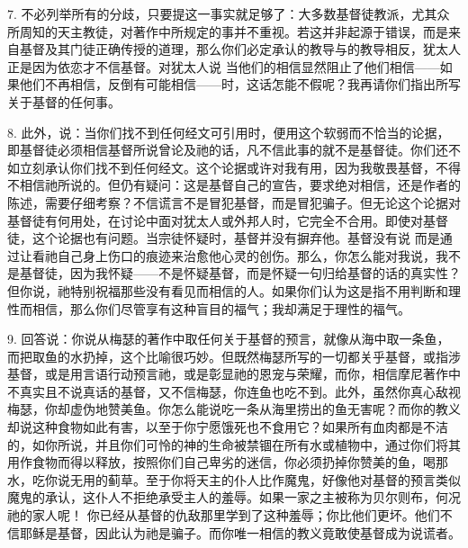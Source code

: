 7. 不必列举所有的分歧，只要提这一事实就足够了：大多数基督徒教派，尤其众所周知的天主教徒，对著作中所规定的事并不重视。若这并非起源于错误，而是来自基督及其门徒正确传授的道理，那么你们必定承认的教导与的教导相反，犹太人正是因为依恋才不信基督。对犹太人说 当他们的相信显然阻止了他们相信——如果他们不再相信，反倒有可能相信——时，这话怎能不假呢？我再请你们指出所写关于基督的任何事。\par

8. 此外，说：当你们找不到任何经文可引用时，便用这个软弱而不恰当的论据，即基督徒必须相信基督所说曾论及祂的话，凡不信此事的就不是基督徒。你们还不如立刻承认你们找不到任何经文。这个论据或许对我有用，因为我敬畏基督，不得不相信祂所说的。但仍有疑问：这是基督自己的宣告，要求绝对相信，还是作者的陈述，需要仔细考察？不信谎言不是冒犯基督，而是冒犯骗子。但无论这个论据对基督徒有何用处，在讨论中面对犹太人或外邦人时，它完全不合用。即使对基督徒，这个论据也有问题。当宗徒怀疑时，基督并没有摒弃他。基督没有说 而是通过让看祂自己身上伤口的痕迹来治愈他心灵的创伤。那么，你怎么能对我说，我不是基督徒，因为我怀疑——不是怀疑基督，而是怀疑一句归给基督的话的真实性？但你说，祂特别祝福那些没有看见而相信的人。如果你们认为这是指不用判断和理性而相信，那么你们尽管享有这种盲目的福气；我却满足于理性的福气。\par

9. 回答说：你说从梅瑟的著作中取任何关于基督的预言，就像从海中取一条鱼，而把取鱼的水扔掉，这个比喻很巧妙。但既然梅瑟所写的一切都关乎基督，或指涉基督，或是用言语行动预言祂，或是彰显祂的恩宠与荣耀，而你，相信摩尼著作中不真实且不说真话的基督，又不信梅瑟，你连鱼也吃不到。此外，虽然你真心敌视梅瑟，你却虚伪地赞美鱼。你怎么能说吃一条从海里捞出的鱼无害呢？而你的教义却说这种食物如此有害，以至于你宁愿饿死也不食用它？如果所有血肉都是不洁的，如你所说，并且你们可怜的神的生命被禁锢在所有水或植物中，通过你们将其用作食物而得以释放，按照你们自己卑劣的迷信，你必须扔掉你赞美的鱼，喝那水，吃你说无用的蓟草。至于你将天主的仆人比作魔鬼，好像他对基督的预言类似魔鬼的承认，这仆人不拒绝承受主人的羞辱。如果一家之主被称为贝尔则布，何况祂的家人呢！ 你已经从基督的仇敌那里学到了这种羞辱；你比他们更坏。他们不信耶稣是基督，因此认为祂是骗子。而你唯一相信的教义竟敢使基督成为说谎者。\newline{}\par

